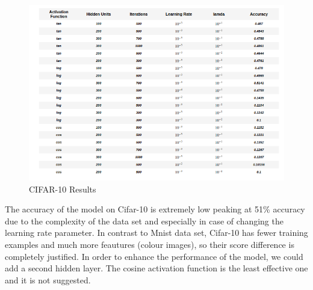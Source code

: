 \documentclass[11pt]{article}
\begin{document}
\begin{figure}[ht!]
  \includegraphics[width=\linewidth]{./Project_1_files/Cifar.png}
  \caption{CIFAR-10 Results}
  \label{fig:cifar_results}
\end{figure}

\noindent The accuracy of the model on Cifar-10 is extremely low peaking at 51\% accuracy due to the complexity of the data set and especially in case of changing the learning rate parameter. In contrast to Mnist data set, Cifar-10 has fewer training examples and much more feautures (colour images), so their score difference is completely justified. In order to enhance the performance of the model, we could add a second hidden layer. The cosine activation function is the least effective one and it is not suggested. 

\nocite{*}
 
\underline{}

\end{document}
